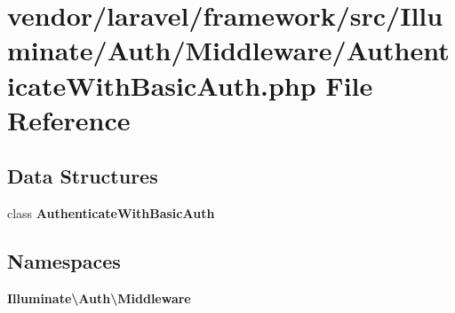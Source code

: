 \section{vendor/laravel/framework/src/\+Illuminate/\+Auth/\+Middleware/\+Authenticate\+With\+Basic\+Auth.php File Reference}
\label{_authenticate_with_basic_auth_8php}
\subsection*{Data Structures}
\begin{DoxyCompactItemize}
\item 
class {\bf Authenticate\+With\+Basic\+Auth}
\end{DoxyCompactItemize}
\subsection*{Namespaces}
\begin{DoxyCompactItemize}
\item 
 {\bf Illuminate\textbackslash{}\+Auth\textbackslash{}\+Middleware}
\end{DoxyCompactItemize}
